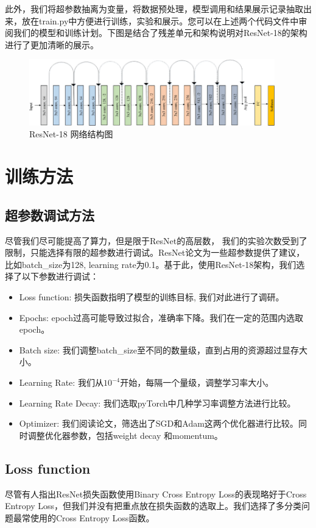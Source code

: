 \documentclass[hyperref, UTF8, 12pt]{article}
\theoremstyle{definition}
\begin{document}
\indent
此外，我们将超参数抽离为变量，将数据预处理，模型调用和结果展示记录抽取出来，放在train.py中方便进行训练，实验和展示。您可以在上述两个代码文件中审阅我们的模型和训练计划。下图是结合了残差单元和架构说明对ResNet-18的架构进行了更加清晰的展示。
\begin{figure}[h] %
	\centering %
	\includegraphics[width=0.95\textwidth]{resnet18.png} %
	\caption{ResNet-18 网络结构图} %
	\label{Fig.resnet3} %
\end{figure}


\section{训练方法}
\subsection{超参数调试方法}
尽管我们尽可能提高了算力，但是限于ResNet的高层数， 我们的实验次数受到了限制，只能选择有限的超参数进行调试。ResNet论文\cite{he2015deep}为一些超参数提供了建议，比如batch\_size为128, learning rate为0.1。基于此，使用ResNet-18架构，我们选择了以下参数进行调试：
\begin{itemize}
	\item Loss function: 损失函数指明了模型的训练目标, 我们对此进行了调研。
	\item Epochs: epoch过高可能导致过拟合，准确率下降。我们在一定的范围内选取epoch。
	\item Batch size: 我们调整batch\_size至不同的数量级，直到占用的资源超过显存大小。
	\item Learning Rate: 我们从$10 ^ {-4}$开始，每隔一个量级，调整学习率大小。
	\item Learning Rate Decay: 我们选取pyTorch中几种学习率调整方法进行比较。
	\item Optimizer: 我们阅读论文，筛选出了SGD和Adam这两个优化器进行比较。\cite{keskar2017improving}同时调整优化器参数，包括weight decay 和momentum。
\end{itemize}

\subsection {Loss function}
尽管有人指出ResNet损失函数使用Binary Cross Entropy Loss的表现略好于Cross Entropy Loss\cite{beyer2020imagenet}，但我们并没有把重点放在损失函数的选取上。我们选择了多分类问题最常使用的Cross Entropy Loss函数。
\end{document}
